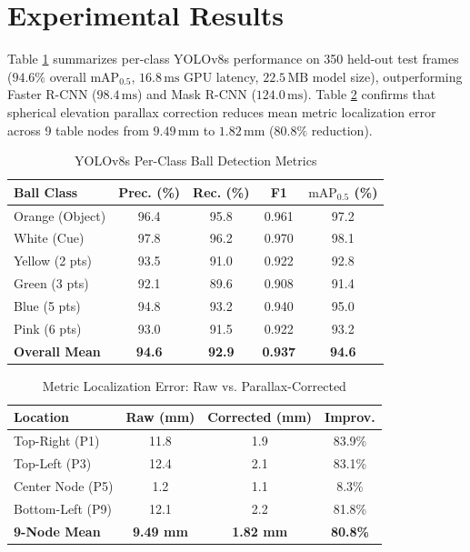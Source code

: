 \documentclass[conference]{IEEEtran}
\begin{document}
\section{Experimental Results}
Table \ref{tab:det} summarizes per-class YOLOv8s performance on 350 held-out test frames ($94.6\%$ overall $\text{mAP}_{0.5}$, $16.8\,\text{ms}$ GPU latency, $22.5\,\text{MB}$ model size), outperforming Faster R-CNN ($98.4\,\text{ms}$) and Mask R-CNN ($124.0\,\text{ms}$). Table \ref{tab:para} confirms that spherical elevation parallax correction reduces mean metric localization error across 9 table nodes from $9.49\,\text{mm}$ to $1.82\,\text{mm}$ ($80.8\%$ reduction).

\begin{table}[htbp]
\centering
\caption{YOLOv8s Per-Class Ball Detection Metrics}
\label{tab:det}
\scriptsize
\begin{tabular}{|l|c|c|c|c|}
\hline
\textbf{Ball Class} & \textbf{Prec. (\%)} & \textbf{Rec. (\%)} & \textbf{F1} & \textbf{$\text{mAP}_{0.5}$ (\%)} \\
\hline
Orange (Object) & 96.4 & 95.8 & 0.961 & 97.2 \\
White (Cue) & 97.8 & 96.2 & 0.970 & 98.1 \\
Yellow (2 pts) & 93.5 & 91.0 & 0.922 & 92.8 \\
Green (3 pts) & 92.1 & 89.6 & 0.908 & 91.4 \\
Blue (5 pts) & 94.8 & 93.2 & 0.940 & 95.0 \\
Pink (6 pts) & 93.0 & 91.5 & 0.922 & 93.2 \\
\hline
\textbf{Overall Mean} & \textbf{94.6} & \textbf{92.9} & \textbf{0.937} & \textbf{94.6} \\
\hline
\end{tabular}
\end{table}

\begin{table}[htbp]
\centering
\caption{Metric Localization Error: Raw vs. Parallax-Corrected}
\label{tab:para}
\scriptsize
\begin{tabular}{|l|c|c|c|}
\hline
\textbf{Location} & \textbf{Raw (mm)} & \textbf{Corrected (mm)} & \textbf{Improv.} \\
\hline
Top-Right (P1) & 11.8 & 1.9 & 83.9\% \\
Top-Left (P3) & 12.4 & 2.1 & 83.1\% \\
Center Node (P5) & 1.2 & 1.1 & 8.3\% \\
Bottom-Left (P9) & 12.1 & 2.2 & 81.8\% \\
\hline
\textbf{9-Node Mean} & \textbf{9.49 mm} & \textbf{1.82 mm} & \textbf{80.8\%} \\
\hline
\end{tabular}
\end{table}
\end{document}
